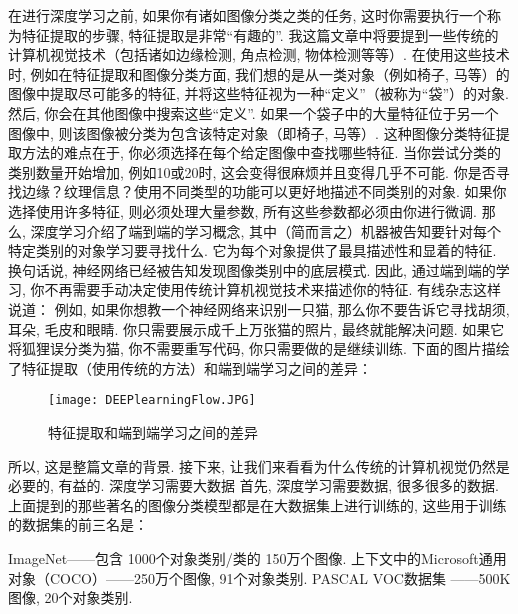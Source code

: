 在进行深度学习之前, 如果你有诸如图像分类之类的任务, 这时你需要执行一个称为特征提取的步骤, 特征提取是非常“有趣的”. 我这篇文章中将要提到一些传统的计算机视觉技术（包括诸如边缘检测, 角点检测, 物体检测等等）.
在使用这些技术时, 例如在特征提取和图像分类方面, 我们想的是从一类对象（例如椅子, 马等）的图像中提取尽可能多的特征, 并将这些特征视为一种“定义”（被称为“袋”）的对象. 然后, 你会在其他图像中搜索这些“定义”. 如果一个袋子中的大量特征位于另一个图像中, 则该图像被分类为包含该特定对象（即椅子, 马等）.
这种图像分类特征提取方法的难点在于, 你必须选择在每个给定图像中查找哪些特征. 当你尝试分类的类别数量开始增加, 例如10或20时, 这会变得很麻烦并且变得几乎不可能. 你是否寻找边缘？纹理信息？使用不同类型的功能可以更好地描述不同类别的对象. 如果你选择使用许多特征, 则必须处理大量参数, 所有这些参数都必须由你进行微调.
那么, 深度学习介绍了端到端的学习概念, 其中（简而言之）机器被告知要针对每个特定类别的对象学习要寻找什么. 它为每个对象提供了最具描述性和显着的特征. 换句话说, 神经网络已经被告知发现图像类别中的底层模式.
因此, 通过端到端的学习, 你不再需要手动决定使用传统计算机视觉技术来描述你的特征. 有线杂志这样说道：
例如, 如果你想教一个神经网络来识别一只猫, 那么你不要告诉它寻找胡须, 耳朵, 毛皮和眼睛. 你只需要展示成千上万张猫的照片, 最终就能解决问题. 如果它将狐狸误分类为猫, 你不需要重写代码, 你只需要做的是继续训练.
下面的图片描绘了特征提取（使用传统的方法）和端到端学习之间的差异：
\begin{figure}[H]
\centering
\texttt{[image: DEEPlearningFlow.JPG]}
\caption{特征提取和端到端学习之间的差异}
\label{DEEPlearningFlow}
\end{figure}
所以, 这是整篇文章的背景. 接下来, 让我们来看看为什么传统的计算机视觉仍然是必要的, 有益的. 深度学习需要大数据
首先, 深度学习需要数据, 很多很多的数据. 上面提到的那些著名的图像分类模型都是在大数据集上进行训练的, 这些用于训练的数据集的前三名是：

ImageNet——包含 1000个对象类别/类的 150万个图像.
上下文中的Microsoft通用对象（COCO）——250万个图像, 91个对象类别.
PASCAL VOC数据集 ——500K图像, 20个对象类别.

